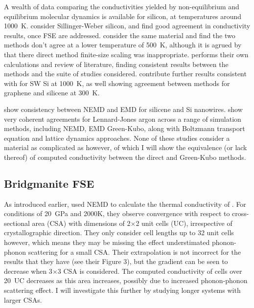 A wealth of data comparing the conductivities yielded by non-equilibrium and equilibrium molecular dynamics is available for silicon, at temperatures around 1000~K. \citet{Schelling2002} consider Sillinger-Weber silicon, and find good agreement in conductivity results, once FSE are addressed. \citet{Sellan2010} consider the same material and find the two methods don't agree at a lower temperature of 500~K, although it is agrued by \citet{Howell2012} that there direct method finite-size scaling was inappropriate. \citeauthor{Howell2012} performs their own calculations and review of literature, finding consistent results between the methods and the suite of studies considered. \citet{Wang2017} contribute further results consistent with \citeauthor{Howell2012} for SW Si at 1000~K, as well showing agreement between methods for graphene and silicene at 300~K. 

\citet{Dong2018} show consistency between NEMD and EMD for silicene and Si nanowires. \citet{Turney2009} show very coherent agreements for Lennard-Jones argon across a range of simulation methods, including NEMD, EMD Green-Kubo, along with Boltzmann transport equation and lattice dynamics approaches. None of these studies consider a material as complicated as \bdgs however, of which I will show the equivalence (or lack thereof) of computed conductivity between the direct and Green-Kubo methods.

\subsection{Bridgmanite FSE}

As introduced earlier, \citet{Ammann2014} used NEMD to calculate the thermal conductivity of \bdg. For conditions of 20~GPa and 2000K, they observe convergence with respect to cross-sectional area (CSA) with dimensions of 2$\times$2 unit cells (UC), irrespective of crystallographic direction. They only consider cell lengths up to 32 unit cells however, which means they may be missing the effect understimated phonon-phonon scattering for a small CSA. Their extrapolation is not incorrect for the results that they have (see their Figure 3), but the gradient can be seen to decrease when 3$\times$3 CSA is considered. The computed conductivity of cells over 20~UC decreases as this area increases, possibly due to increased phonon-phonon scattering effect. I will investigate this further by studying longer systems with larger CSAs.

